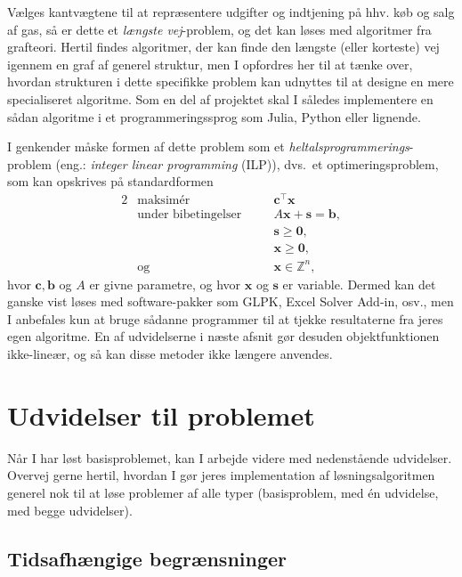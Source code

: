 \documentclass[12pt,oneside,final]{article}
\newcommand{\Z}{\mathbb{Z}}
\newcommand{\1}{\mathbbm{1}}
\newcommand{\vzero}{\bm{0}}
\newcommand{\vx}{\bm{x}}
\newcommand{\vb}{\bm{b}}
\newcommand{\vc}{\bm{c}}
\newcommand{\vs}{\bm{s}}
\begin{document}
Vælges kantvægtene til at repræsentere udgifter og indtjening på hhv. køb og salg af gas, så er dette et \emph{længste vej}-problem, og det kan løses med algoritmer fra grafteori.
Hertil findes algoritmer, der kan finde den længste (eller korteste) vej igennem en graf af generel struktur, men I opfordres her til at tænke over, hvordan strukturen i dette specifikke problem kan udnyttes til at designe en mere specialiseret algoritme.
Som en del af projektet skal I således implementere en sådan algoritme i et programmeringssprog som Julia, Python eller lignende.

I genkender måske formen af dette problem som et \emph{heltalsprogrammerings}-problem (eng.: \emph{integer linear programming} (ILP)), dvs.\ et optimeringsproblem, som kan opskrives på standardformen
%
\begin{alignat*}{2}
 & \text{maksimér}            &\quad  & \vc^{\top} \vx  \\
 & \text{under bibetingelser} &\quad  & A \vx + \vs = \vb , \\
 &                            &\quad  & \vs \geq \vzero , \\
 &                            &\quad  & \vx \geq \vzero , \\
 & \text{og}                  &\quad  & \vx \in \Z^{n} ,
\end{alignat*}
%
hvor \(\vc,\vb\) og \(A\) er givne parametre, og hvor \(\vx\) og \(\vs\) er variable.
Dermed kan det ganske vist løses med software-pakker som GLPK, Excel Solver Add-in, osv., men I anbefales kun at bruge sådanne programmer til at tjekke resultaterne fra jeres egen algoritme.
En af udvidelserne i næste afsnit gør desuden objektfunktionen ikke-lineær, og så kan disse metoder ikke længere anvendes.


\clearpage
\section{Udvidelser til problemet}

Når I har løst basisproblemet, kan I arbejde videre med nedenstående udvidelser.
Overvej gerne hertil, hvordan I gør jeres implementation af løsningsalgoritmen generel nok til at løse problemer af alle typer (basisproblem, med én udvidelse, med begge udvidelser).


\subsection{Tidsafhængige begrænsninger}
\end{document}
